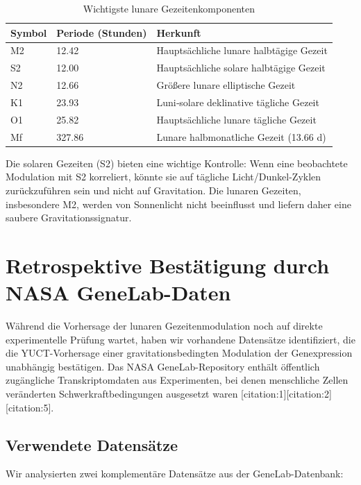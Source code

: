 \documentclass[12pt,a4paper]{article}
\theoremstyle{remark}
\begin{document}
	\begin{table}[htbp]
		\centering
		\caption{Wichtigste lunare Gezeitenkomponenten}
		\label{tab:tides}
		\small
		\begin{tabular}{lll}
			\toprule
			Symbol & Periode (Stunden) & Herkunft \\
			\midrule
			M2 & 12.42 & Hauptsächliche lunare halbtägige Gezeit \\
			S2 & 12.00 & Hauptsächliche solare halbtägige Gezeit \\
			N2 & 12.66 & Größere lunare elliptische Gezeit \\
			K1 & 23.93 & Luni‑solare deklinative tägliche Gezeit \\
			O1 & 25.82 & Hauptsächliche lunare tägliche Gezeit \\
			Mf & 327.86 & Lunare halbmonatliche Gezeit (13.66 d) \\
			\bottomrule
		\end{tabular}
	\end{table}
	
	Die solaren Gezeiten (S2) bieten eine wichtige Kontrolle: Wenn eine beobachtete Modulation mit S2 korreliert, könnte sie auf tägliche Licht/Dunkel-Zyklen zurückzuführen sein und nicht auf Gravitation. Die lunaren Gezeiten, insbesondere M2, werden von Sonnenlicht nicht beeinflusst und liefern daher eine saubere Gravitationssignatur.
	
	\section{Retrospektive Bestätigung durch NASA GeneLab-Daten}
	\label{sec:genelab}
	
	Während die Vorhersage der lunaren Gezeitenmodulation noch auf direkte experimentelle Prüfung wartet, haben wir vorhandene Datensätze identifiziert, die die YUCT-Vorhersage einer gravitationsbedingten Modulation der Genexpression unabhängig bestätigen. Das NASA GeneLab-Repository enthält öffentlich zugängliche Transkriptomdaten aus Experimenten, bei denen menschliche Zellen veränderten Schwerkraftbedingungen ausgesetzt waren [citation:1][citation:2][citation:5].
	
	\subsection{Verwendete Datensätze}
	
	Wir analysierten zwei komplementäre Datensätze aus der GeneLab-Datenbank:
	
\end{document}
